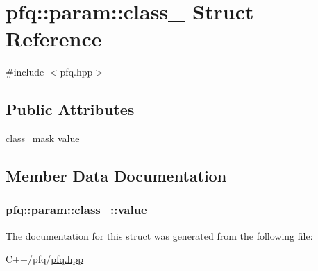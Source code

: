 \hypertarget{structpfq_1_1param_1_1class__}{\section{pfq\+:\+:param\+:\+:class\+\_\+ Struct Reference}
\label{structpfq_1_1param_1_1class__}
}


{\ttfamily \#include $<$pfq.\+hpp$>$}

\subsection*{Public Attributes}
\begin{DoxyCompactItemize}
\item 
\hyperlink{namespacepfq_a96af1f5ed530eff563eb917516758fbb}{class\+\_\+mask} \hyperlink{structpfq_1_1param_1_1class___a014cc8b1b64e04bbcd9d8f2ed793efbb}{value}
\end{DoxyCompactItemize}


\subsection{Member Data Documentation}
\hypertarget{structpfq_1_1param_1_1class___a014cc8b1b64e04bbcd9d8f2ed793efbb}{
\subsubsection[{value}]{ pfq\+::param\+::class\+\_\+\+::value}}\label{structpfq_1_1param_1_1class___a014cc8b1b64e04bbcd9d8f2ed793efbb}


The documentation for this struct was generated from the following file\+:\begin{DoxyCompactItemize}
\item 
C++/pfq/\hyperlink{pfq_8hpp}{pfq.\+hpp}\end{DoxyCompactItemize}
